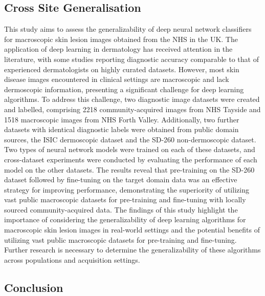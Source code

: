 \subsection*{Cross Site Generalisation}
This study aims to assess the generalizability of deep neural network classifiers for macroscopic skin lesion images obtained from the NHS in the UK. The application of deep learning in dermatology has received attention in the literature, with some studies reporting diagnostic accuracy comparable to that of experienced dermatologists on highly curated datasets. However, most skin disease images encountered in clinical settings are macroscopic and lack dermoscopic information, presenting a significant challenge for deep learning algorithms. To address this challenge, two diagnostic image datasets were created and labelled, comprising 2218 community-acquired images from NHS Tayside and 1518 macroscopic images from NHS Forth Valley. Additionally, two further datasets with identical diagnostic labels were obtained from public domain sources, the ISIC dermoscopic dataset and the SD-260 non-dermoscopic dataset. Two types of neural network models were trained on each of these datasets, and cross-dataset experiments were conducted by evaluating the performance of each model on the other datasets. The results reveal that pre-training on the SD-260 dataset followed by fine-tuning on the target domain data was an effective strategy for improving performance, demonstrating the superiority of utilizing vast public macroscopic datasets for pre-training and fine-tuning with locally sourced community-acquired data. The findings of this study highlight the importance of considering the generalizability of deep learning algorithms for macroscopic skin lesion images in real-world settings and the potential benefits of utilizing vast public macroscopic datasets for pre-training and fine-tuning. Further research is necessary to determine the generalizability of these algorithms across populations and acquisition settings.

\subsection*{Conclusion}
